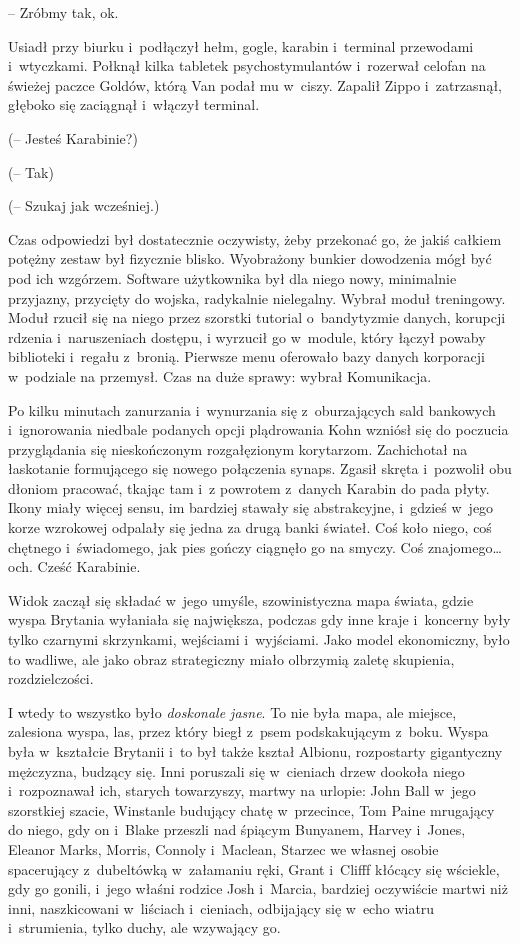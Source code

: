 \documentclass[oneside,polish,11pt,sfheadings]{mwbk}
\begin{document}
-- Zróbmy tak, ok.

Usiadł przy biurku i~podłączył hełm, gogle, karabin i~terminal
przewodami i~wtyczkami. Połknął kilka tabletek psychostymulantów i~rozerwał celofan na świeżej paczce Goldów, którą Van podał mu w~ciszy.
Zapalił Zippo i~zatrzasnął, głęboko się zaciągnął i~włączył terminal.

(-- Jesteś Karabinie?)

(-- Tak)

(-- Szukaj jak wcześniej.)

Czas odpowiedzi był dostatecznie oczywisty, żeby przekonać go, że jakiś
całkiem potężny zestaw był fizycznie blisko. Wyobrażony bunkier
dowodzenia mógł być pod ich wzgórzem. Software użytkownika był dla niego
nowy, minimalnie przyjazny, przycięty do wojska, radykalnie nielegalny.
Wybrał moduł treningowy. Moduł rzucił się na niego przez szorstki
tutorial o~bandytyzmie danych, korupcji rdzenia i~naruszeniach dostępu,
i wyrzucił go w~module, który łączył powaby biblioteki i~regału z~bronią. Pierwsze menu oferowało bazy danych korporacji w~podziale na
przemysł. Czas na duże sprawy: wybrał Komunikacja.

Po kilku minutach zanurzania i~wynurzania się z~oburzających sald
bankowych i~ignorowania niedbale podanych opcji plądrowania Kohn wzniósł
się do poczucia przyglądania się nieskończonym rozgałęzionym korytarzom.
Zachichotał na łaskotanie formującego się nowego połączenia synaps.
Zgasił skręta i~pozwolił obu dłoniom pracować, tkając tam i~z powrotem z~danych Karabin do pada płyty. Ikony miały więcej sensu, im bardziej
stawały się abstrakcyjne, i~gdzieś w~jego korze wzrokowej odpalały się
jedna za drugą banki świateł. Coś koło niego, coś chętnego i~świadomego,
jak pies gończy ciągnęło go na smyczy. Coś znajomego\ldots och. Cześć
Karabinie.

Widok zaczął się składać w~jego umyśle, szowinistyczna mapa świata,
gdzie wyspa Brytania wyłaniała się największa, podczas gdy inne kraje i~koncerny były tylko czarnymi skrzynkami, wejściami i~wyjściami. Jako
model ekonomiczny, było to wadliwe, ale jako obraz strategiczny miało
olbrzymią zaletę skupienia, rozdzielczości.

I wtedy to wszystko było \emph{doskonale jasne}. To nie była mapa, ale
miejsce, zalesiona wyspa, las, przez który biegł z~psem podskakującym z~boku. Wyspa była w~kształcie Brytanii i~to był także kształ Albionu,
rozpostarty gigantyczny mężczyzna, budzący się. Inni poruszali się w~cieniach drzew dookoła niego i~rozpoznawał ich, starych towarzyszy,
martwy na urlopie: John Ball w~jego szorstkiej szacie, Winstanle
budujący chatę w~przecince, Tom Paine mrugający do niego, gdy on i~Blake
przeszli nad śpiącym Bunyanem, Harvey i~Jones, Eleanor Marks, Morris,
Connoly i~Maclean, Starzec we własnej osobie spacerujący z~dubeltówką w~załamaniu ręki, Grant i~Clifff kłócący się wściekle, gdy go gonili, i~jego właśni rodzice Josh i~Marcia, bardziej oczywiście martwi niż inni,
naszkicowani w~liściach i~cieniach, odbijający się w~echo wiatru i~strumienia, tylko duchy, ale wzywający go.
\end{document}
